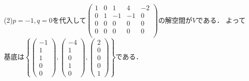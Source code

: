 \documentclass[
		book,
		head_space=20mm,
		foot_space=20mm,
		gutter=10mm,
		line_length=190mm
]{jlreq}
\begin{document}
(2)$p=-1,q=0$を代入して$\begin{pmatrix}
    1&0&1&4&-2\\
    0&1&-1&-1&0\\
    0&0&0&0&0\\
    0&0&0&0&0\\
    \end{pmatrix}$の解空間が$V$である．
よって基底は$\left\{ \begin{pmatrix}
-1\\1\\1\\0\\0
\end{pmatrix},\begin{pmatrix}
-4\\1\\0\\1\\0
\end{pmatrix},\begin{pmatrix}
2\\0\\0\\0\\1
\end{pmatrix} \right\}$である．
\end{document}
